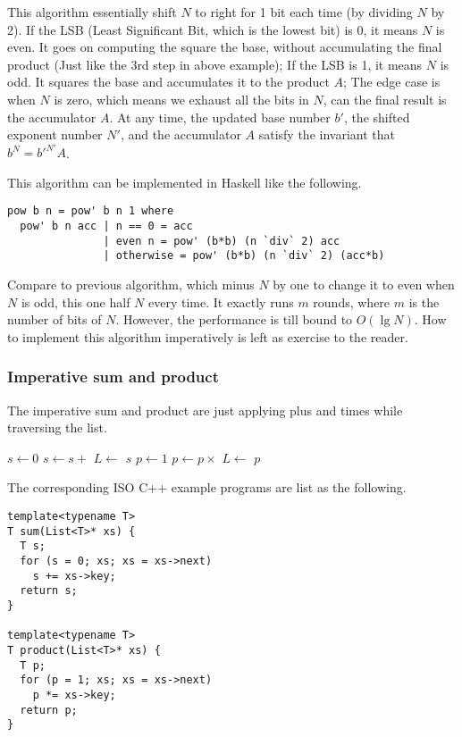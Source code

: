 \documentclass{article}
\begin{document}
This algorithm essentially shift $N$ to right for 1 bit each time (by dividing $N$ by 2). If the LSB (Least Significant Bit,
which is the lowest bit) is 0, it means $N$ is even. It goes on computing the square the base, without accumulating the
final product (Just like the 3rd step in above example); If the LSB is 1, it means $N$ is odd. It squares the base and
accumulates it to the product $A$; The edge case is when $N$ is zero, which means we exhaust all the bits in $N$, can
the final result is the accumulator $A$. At any time, the updated base number $b'$, the shifted exponent number $N'$,
and the accumulator $A$ satisfy the invariant that $b^N = b'^{N'}A$. 

This algorithm can be implemented in Haskell like the following.

\lstset{language=Haskell}
\begin{lstlisting}
pow b n = pow' b n 1 where
  pow' b n acc | n == 0 = acc
               | even n = pow' (b*b) (n `div` 2) acc
               | otherwise = pow' (b*b) (n `div` 2) (acc*b)
\end{lstlisting}

Compare to previous algorithm, which minus $N$ by one to change it to even when $N$ is odd, this one half $N$ every
time. It exactly runs $m$ rounds, where $m$ is the number of bits of $N$. However, the performance is till bound to 
$O(\lg N)$. How to implement this algorithm imperatively is left as exercise to the reader.

\subsubsection{Imperative sum and product}
The imperative sum and product are just applying plus and times while traversing the list.

\begin{algorithmic}
  \State $s \gets 0$
    \State $s \gets s +$ 
    \State $L \gets$ 
  \EndWhile
  \State \Return $s$
\EndFunction
\Statex
{}
  \State $p \gets 1$
    \State $p \gets p \times $ 
    \State $L \gets$ 
  \EndWhile
  \State \Return $p$
\EndFunction
\end{algorithmic}

The corresponding ISO C++ example programs are list as the following.

\lstset{language=C++}
\begin{lstlisting}
template<typename T>
T sum(List<T>* xs) {
  T s;
  for (s = 0; xs; xs = xs->next)
    s += xs->key;
  return s;
}

template<typename T>
T product(List<T>* xs) {
  T p;
  for (p = 1; xs; xs = xs->next)
    p *= xs->key;
  return p;
}
\end{lstlisting}
\end{document}
